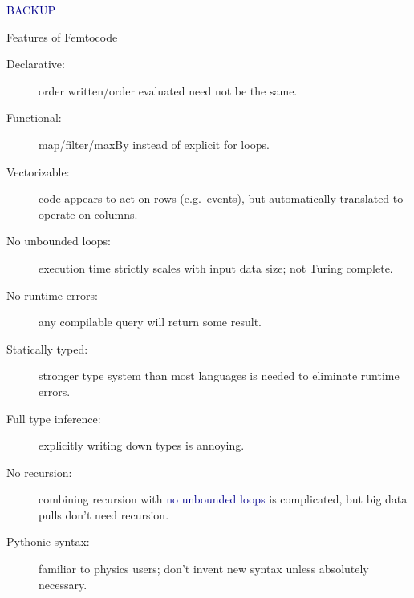 \documentclass{beamer}
\begin{document}
\begin{frame}{}
\begin{center}
\textcolor{darkblue}{\huge BACKUP}
\end{center}
\end{frame}

\begin{frame}{Features of Femtocode}
\vspace{0.5 cm}
\begin{description}
\item[Declarative:] order written/order evaluated need not be the same.
\item[Functional:] map/filter/maxBy instead of explicit for loops.
\item[Vectorizable:] code appears to act on rows (e.g.\ events), but automatically translated to operate on columns.
\item[No unbounded loops:] execution time strictly scales with input data size; not Turing complete.
\item[No runtime errors:] any compilable query will return some result.
\item[Statically typed:] stronger type system than most languages is needed to eliminate runtime errors.
\item[Full type inference:] explicitly writing down types is annoying.
\item[No recursion:] combining recursion with \textcolor{darkblue}{no unbounded loops} is complicated, but big data pulls don't need recursion.
\item[Pythonic syntax:] familiar to physics users; don't invent new syntax unless absolutely necessary.
\end{description}
\end{frame}
\end{document}
